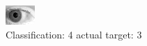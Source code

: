 \begin{figure}[h!]
\begin{center}
\includegraphics[width=0.60\columnwidth]{figures/ID238_class_4_target_3.png}
\end{center}
\caption{ Classification: 4 actual target: 3}
\label{fig:ID238_class_4_target_3}
\end{figure}
